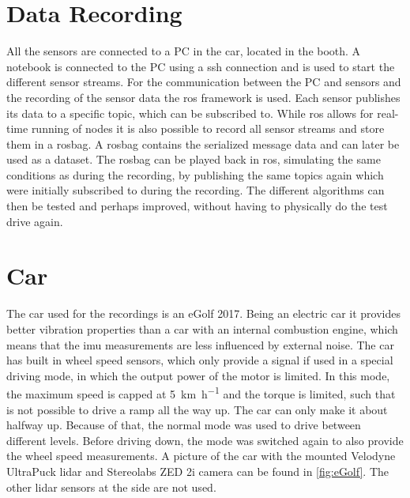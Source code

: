 \section{Data Recording}
All the sensors are connected to a PC in the car, located in the booth.
A notebook is connected to the PC using a \gls{ssh} connection and is used to start the different sensor streams.
For the communication between the PC and sensors and the recording of the sensor data the \gls{ros} framework is used.
Each sensor publishes its data to a specific topic, which can be subscribed to.
While \gls{ros} allows for real-time running of nodes it is also possible to record all sensor streams and store them in a rosbag.
A rosbag contains the serialized message data and can later be used as a dataset.
The rosbag can be played back in \gls{ros}, simulating the same conditions as during the recording, by publishing the same topics again which were initially subscribed to during the recording.
The different algorithms can then be tested and perhaps improved, without having to physically do the test drive again.



\section{Car}
\label{sec:car}
The car used for the recordings is an eGolf 2017.
Being an electric car it provides better vibration properties than a car with an internal combustion engine, which means that the \gls{imu} measurements are less influenced by external noise.
The car has built in wheel speed sensors, which only provide a signal if used in a special driving mode, in which the output power of the motor is limited.
In this mode, the maximum speed is capped at \SI{5}{\kilo\metre\per\hour} and the torque is limited, such that is not possible to drive a ramp all the way up.
The car can only make it about halfway up.
Because of that, the normal mode was used to drive between different levels.
Before driving down, the mode was switched again to also provide the wheel speed measurements.
A picture of the car with the mounted Velodyne UltraPuck \gls{lidar} and Stereolabs ZED 2i camera can be found in \cref{fig:eGolf}.
The other \gls{lidar} sensors at the side are not used.
\begin{figure}[htb]
    {}
\end{figure}




